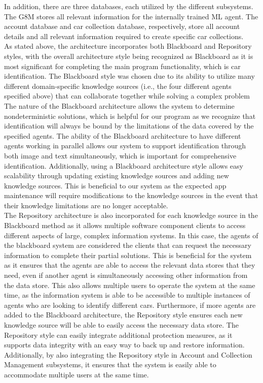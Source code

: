\documentclass[]{article}
\begin{document}
\noindent In addition, there are three databases, each utilized by the different subsystems. The G8M stores all relevant information for the internally trained ML agent. The account database and car collection database, respectively, store all account details and all relevant information required to create specific car collections.\\

\noindent As stated above, the architecture incorporates both Blackboard and Repository styles, with the overall architecture style being recognized as Blackboard as it is most significant for completing the main program functionality, which is car identification. The Blackboard style was chosen due to its ability to utilize many different domain-specific knowledge sources (i.e., the four different agents specified above) that can collaborate together while solving a complex problem\\

\noindent The nature of the Blackboard architecture allows the system to determine nondeterministic solutions, which is helpful for our program as we recognize that identification will always be bound by the limitations of the data covered by the specified agents. The ability of the Blackboard architecture to have different agents working in parallel allows our system to support identification through both image and text simultaneously, which is important for comprehensive identification. Additionally, using a Blackboard architecture style allows easy scalability through updating existing knowledge sources and adding new knowledge sources. This is beneficial to our system as the expected app maintenance will require modifications to the knowledge sources in the event that their knowledge limitations are no longer acceptable.\\

\noindent The Repository architecture is also incorporated for each knowledge source in the Blackboard method as it allows multiple software component clients to access different aspects of large, complex information systems. In this case, the agents of the blackboard system are considered the clients that can request the necessary information to complete their partial solutions. This is beneficial for the system as it ensures that the agents are able to access the relevant data stores that they need, even if another agent is simultaneously accessing other information from the data store. This also allows multiple users to operate the system at the same time, as the information system is able to be accessible to multiple instances of agents who are looking to identify different cars. Furthermore, if more agents are added to the Blackboard architecture, the Repository style ensures each new knowledge source will be able to easily access the necessary data store. The Repository style can easily integrate additional protection measures, as it supports data integrity with an easy way to back up and restore information. Additionally, by also integrating the Repository style in Account and Collection Management subsystems, it ensures that the system is easily able to accommodate multiple users at the same time.\\
\end{document}
